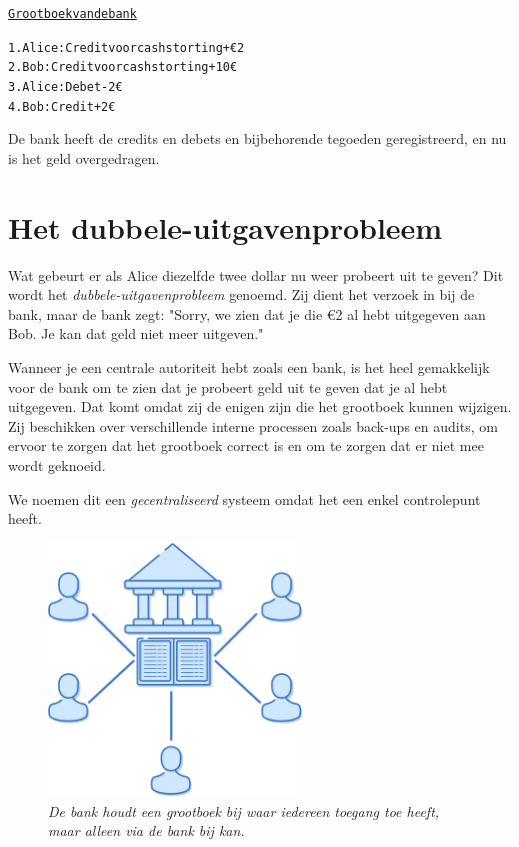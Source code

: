 \documentclass[smalldemyvopaper,11pt,twoside,onecolumn,openright,extrafontsizes]{memoir}
\begin{document}
\begin{alltt}
\underline{Grootboek van de bank}

    1. Alice: Credit voor cash storting +€2
    2. Bob: Credit voor cash storting +10€
    3. Alice: Debet -2€
    4. Bob: Credit +2€
\end{alltt}

De bank heeft de credits en debets en bijbehorende tegoeden geregistreerd, en nu is het geld overgedragen.

\section{Het dubbele-uitgavenprobleem}

Wat gebeurt er als Alice diezelfde twee dollar nu weer probeert uit te geven? Dit wordt het \textit{dubbele-uitgavenprobleem} genoemd. Zij dient het verzoek in bij de bank, maar de bank zegt: "Sorry, we zien dat je die €2 al hebt uitgegeven aan Bob. Je kan dat geld niet meer uitgeven."

Wanneer je een centrale autoriteit hebt zoals een bank, is het heel gemakkelijk voor de bank om te zien dat je probeert geld uit te geven dat je al hebt uitgegeven. Dat komt omdat zij de enigen zijn die het grootboek kunnen wijzigen. Zij beschikken over verschillende interne processen zoals back-ups en audits, om ervoor te zorgen dat het grootboek correct is en om te zorgen dat er niet mee wordt geknoeid.

We noemen dit een \textit{gecentraliseerd} systeem omdat het een enkel controlepunt heeft.

\begin{figure}
    \centering
    \includegraphics[width=0.6\textwidth]{images/fig2.png}
    \caption{\footnotesize{\textit{De bank houdt een grootboek bij waar iedereen toegang toe heeft, maar alleen via de bank bij kan.}}}
    \label{fig2}
\end{figure}
\end{document}
